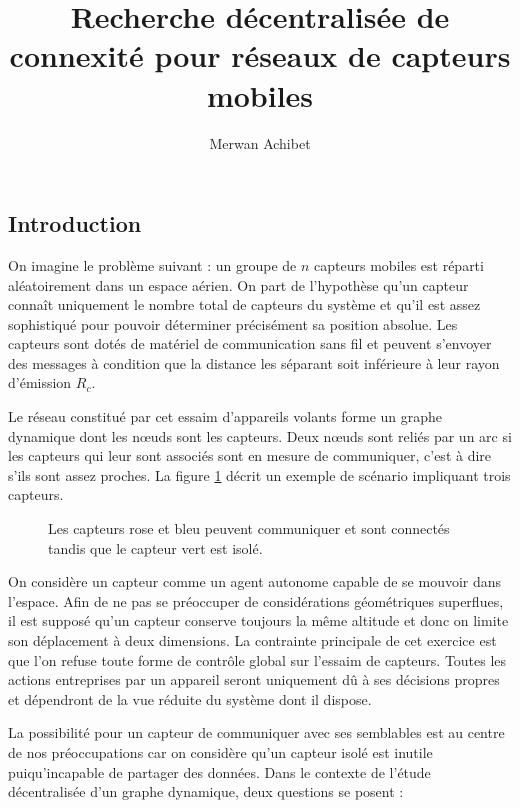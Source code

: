 \documentclass[10pt]{article}
\title{Recherche décentralisée de connexité pour réseaux de capteurs mobiles}
\author{Merwan Achibet}
\date{}
\begin{document}
\maketitle

\begin{multicols}{2}

\section*{Introduction}

On imagine le problème suivant : un groupe de $n$ capteurs mobiles est
réparti aléatoirement dans un espace aérien. On part de l'hypothèse
qu'un capteur connaît uniquement le nombre total de capteurs du
système et qu'il est assez sophistiqué pour pouvoir déterminer
précisément sa position absolue. Les capteurs sont dotés de matériel
de communication sans fil et peuvent s'envoyer des messages à
condition que la distance les séparant soit inférieure à leur rayon
d'émission $R_c$.

Le réseau constitué par cet essaim d'appareils volants forme un graphe
dynamique dont les n\oe uds sont les capteurs. Deux n\oe uds sont
reliés par un arc si les capteurs qui leur sont associés sont en
mesure de communiquer, c'est à dire s'ils sont assez proches. La
figure \ref{communication} décrit un exemple de scénario impliquant
trois capteurs.

\begin{figure}[H]

  \centering

  

  \caption{Les capteurs rose et bleu peuvent communiquer et sont
    connectés tandis que le capteur vert est isolé.}
  \label{communication}

\end{figure}

On considère un capteur comme un agent autonome capable de se mouvoir
dans l'espace. Afin de ne pas se préoccuper de considérations
géométriques superflues, il est supposé qu'un capteur conserve
toujours la même altitude et donc on limite son déplacement à deux
dimensions. La contrainte principale de cet exercice est que l'on
refuse toute forme de contrôle global sur l'essaim de capteurs. Toutes
les actions entreprises par un appareil seront uniquement dû à ses
décisions propres et dépendront de la vue réduite du système dont il
dispose.

La possibilité pour un capteur de communiquer avec ses semblables est
au centre de nos préoccupations car on considère qu'un capteur isolé
est inutile puiqu'incapable de partager des données. Dans le contexte
de l'étude décentralisée d'un graphe dynamique, deux questions se
posent :


\end{multicols}
\end{document}
